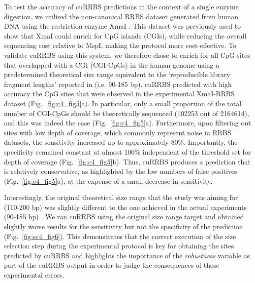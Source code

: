 To test the accuracy of cuRRBS predictions in the context of a single enzyme digestion, we utilised the non-canonical RRBS dataset generated from human DNA using the restriction enzyme XmaI \cite{Tanas2017}. This dataset was previously used to show that XmaI could enrich for CpG islands (\acrshort{CGI}s), while reducing the overall sequencing cost relative to MspI, making the protocol more cost-effective. To validate cuRRBS using this system, we therefore chose to enrich for all CpG sites that overlapped with a CGI (CGI-CpGs) in the human genome using a predetermined theoretical size range equivalent to the `reproducible library fragment lengths' reported in \cite{Tanas2017} (i.e. 90-185 bp). cuRRBS predicted with high accuracy the CpG sites that were observed in the experimental XmaI-RRBS dataset (Fig.~\ref{fig:c4_fig5}a). In particular, only a small proportion of the total number of CGI-CpGs should be theoretically sequenced (102253 out of 2164614), and this was indeed the case (Fig.~\ref{fig:c4_fig5}a). Furthermore, upon filtering out sites with low depth of coverage, which commonly represent noise in RRBS datasets, the sensitivity increased up to approximately 80\%. Importantly, the specificity remained constant at almost 100\% independent of the threshold set for depth of coverage (Fig.~\ref{fig:c4_fig5}b). Thus, cuRRBS produces a prediction that is relatively conservative, as highlighted by the low numbers of false positives (Fig.~\ref{fig:c4_fig5}a), at the expense of a small decrease in sensitivity.

\bigskip

Interestingly, the original theoretical size range that the study was aiming for (110-200 bp) was slightly different to the one achieved in the actual experiments (90-185 bp) \cite{Tanas2017}. We ran cuRRBS using the original size range target and obtained slightly worse results for the sensitivity but not the specificity of the prediction (Fig.~\ref{fig:sc4_fig6}). This demonstrates that the correct execution of the size selection step during the experimental protocol is key for obtaining the sites predicted by cuRRBS and highlights the importance of the \textit{robustness} variable as part of the cuRRBS output in order to judge the consequences of these experimental errors.

